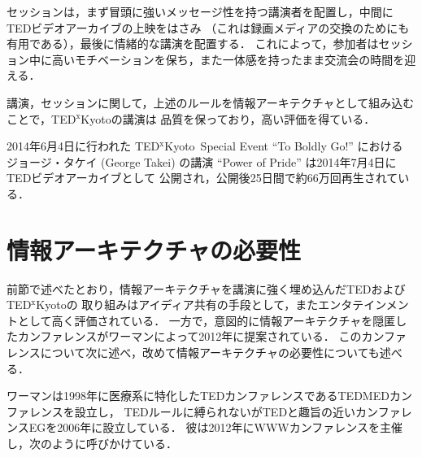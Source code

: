 \documentclass[submit,techreq,jkeyword,noauthor]{ipsj}
\newcommand{\TED}{\textrm{TED}}
\newcommand{\TEDMED}{\textrm{TEDMED}}
\newcommand{\TEDx}{\TED${}^{\textrm{x}}$}
\newcommand{\TEDxKyoto}{\TEDx\-\textrm{Kyoto}}
\begin{document}
セッションは，まず冒頭に強いメッセージ性を持つ講演者を配置し，中間に\TED ビデオアーカイブの上映をはさみ
（これは録画メディアの交換のためにも有用である），最後に情緒的な講演を配置する．
これによって，参加者はセッション中に高いモチベーションを保ち，また一体感を持ったまま交流会の時間を迎える．

講演，セッションに関して，上述のルールを情報アーキテクチャとして組み込むことで，\TEDxKyoto の講演は
品質を保っており，高い評価を得ている．\cite{ml,gr}

2014年6月4日に行われた \TEDxKyoto\ Special Event ``To Boldly Go!'' における
ジョージ・タケイ (George Takei) の講演 ``Power of Pride'' は2014年7月4日に\TED ビデオアーカイブとして
公開され，公開後25日間で約66万回再生されている．\cite{gt}



\section{情報アーキテクチャの必要性}

前節で述べたとおり，情報アーキテクチャを講演に強く埋め込んだ\TED および\TEDxKyoto の
取り組みはアイディア共有の手段として，またエンタテインメントとして高く評価されている．
一方で，意図的に情報アーキテクチャを隠匿したカンファレンスがワーマンによって2012年に提案されている．
このカンファレンスについて次に述べ，改めて情報アーキテクチャの必要性についても述べる．

ワーマンは1998年に医療系に特化した\TED カンファレンスである\TEDMED カンファレンスを設立し，
\TED ルールに縛られないが\TED と趣旨の近いカンファレンスEGを2006年に設立している．
彼は2012年にWWWカンファレンスを主催し，次のように呼びかけている．\cite{wwwweb}
\end{document}

